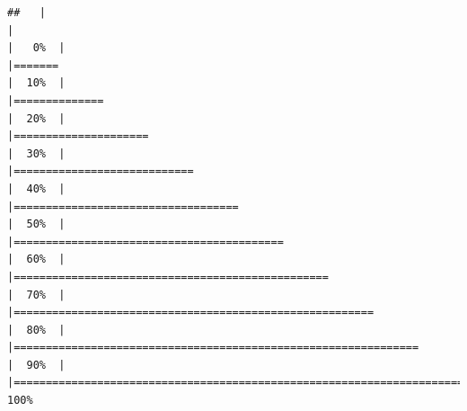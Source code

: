 \documentclass[
]{book}
\begin{document}
\begin{verbatim}
##   |                                                                              |                                                                      |   0%  |                                                                              |=======                                                               |  10%  |                                                                              |==============                                                        |  20%  |                                                                              |=====================                                                 |  30%  |                                                                              |============================                                          |  40%  |                                                                              |===================================                                   |  50%  |                                                                              |==========================================                            |  60%  |                                                                              |=================================================                     |  70%  |                                                                              |========================================================              |  80%  |                                                                              |===============================================================       |  90%  |                                                                              |======================================================================| 100%
\end{verbatim}
\end{document}
